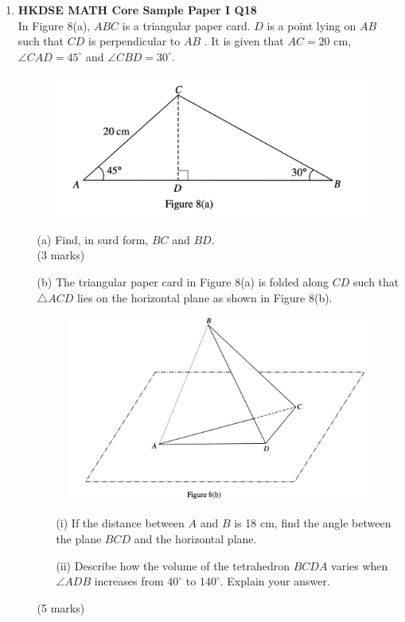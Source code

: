 \documentclass[12pt]{article}
\begin{document}
\begin{enumerate}
	\item \textbf{HKDSE MATH Core Sample Paper I Q18}\\
	In Figure 8(a), $ABC$ is a triangular paper card. $D$ is a point lying on $AB$ such that $CD$ is perpendicular to $AB$ . It is given that $AC = 20$ cm, $\angle CAD = 45^\circ$ and $\angle CBD = 30^\circ$.
	\begin{figure}[H]
		\centering
		\includegraphics[width = .5\linewidth]{SPFigure1.8a}
	\end{figure}
	\begin{enumerate}
		\item[(a)] Find, in surd form, $BC$ and $BD$. \\(3 marks)
		\item[(b)] The triangular paper card in Figure 8(a) is folded along $CD$ such that $\triangle ACD$ lies on the horizontal plane as shown in Figure 8(b).
		\begin{figure}[H]
			\centering
			\includegraphics[width = .5\linewidth]{SPFigure1.8b}
		\end{figure}
		\begin{enumerate}
			\item[(i)] If the distance between $A$ and $B$ is 18 cm, find the angle between the plane $BCD$ and the horizontal plane.
			\item[(ii)] Describe how the volume of the tetrahedron $BCDA$ varies when $\angle ADB$ increases from $40^\circ$ to $140^\circ$. Explain your answer.
		\end{enumerate}
		(5 marks)
	\end{enumerate}


\end{enumerate}
\end{document}
